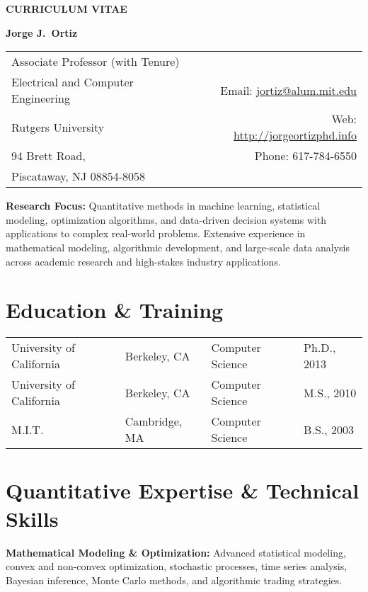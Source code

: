 \documentclass[12pt]{article}
\begin{document}
\pagestyle{CVfooter}

\noindent \textbf{\uppercase{curriculum vitae}}
\vspace{2mm}

\noindent \textbf{Jorge J.\ Ortiz}
\vspace{1mm}

\noindent\begin{tabular*}{\textwidth}{@{\extracolsep{\fill}}l r}
Associate Professor (with Tenure)\\ Electrical and Computer Engineering & Email: \href{mailto:jortiz@alum.mit.edu}{jortiz@alum.mit.edu} \\
Rutgers University & Web: \href{http://jorgeortizphd.info}{http://jorgeortizphd.info} \\
94 Brett Road, & Phone: 617-784-6550 \\
Piscataway, NJ 08854-8058 &  \\
\hline
\end{tabular*}

\vspace{2mm}
\noindent \textbf{Research Focus:} Quantitative methods in machine learning, statistical modeling, optimization algorithms, and data-driven decision systems with applications to complex real-world problems. Extensive experience in mathematical modeling, algorithmic development, and large-scale data analysis across academic research and high-stakes industry applications.

\section{Education \& Training}

\begin{tabular}{l l l l}
University of California & Berkeley, CA & Computer Science & Ph.D., 2013 \\
University of California & Berkeley, CA & Computer Science & M.S., 2010 \\
M.I.T. & Cambridge, MA & Computer Science & B.S., 2003 \\
\end{tabular}

\section{Quantitative Expertise \& Technical Skills}

\textbf{Mathematical Modeling \& Optimization:} Advanced statistical modeling, convex and non-convex optimization, stochastic processes, time series analysis, Bayesian inference, Monte Carlo methods, and algorithmic trading strategies.
\end{document}
